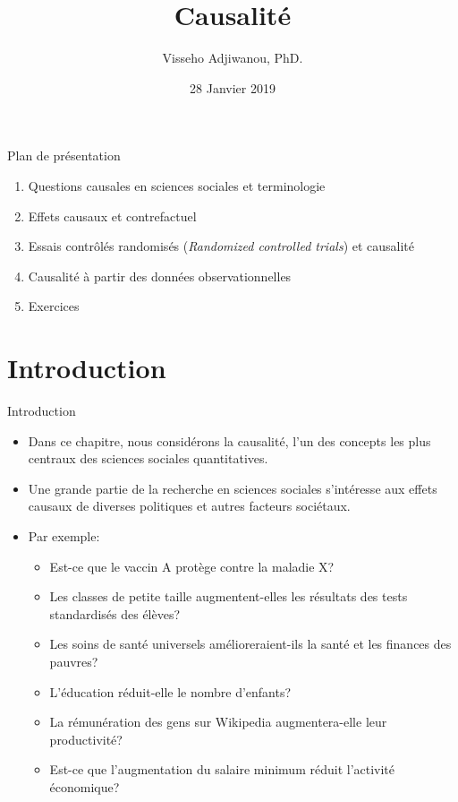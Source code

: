 \documentclass[ignorenonframetext,]{beamer}
\title{Causalité}
\author{Visseho Adjiwanou, PhD.}
\institute{Département de Sociologie - UQAM}
\date{28 Janvier 2019}
\providecommand{\tightlist}{%
  \setlength{\itemsep}{0pt}\setlength{\parskip}{0pt}}
\begin{document}
\frame{\titlepage}

\begin{frame}{Plan de présentation}
\protect\hypertarget{plan-de-presentation}{}

\begin{enumerate}
\item
  Questions causales en sciences sociales et terminologie
\item
  Effets causaux et contrefactuel
\item
  Essais contrôlés randomisés (\emph{Randomized controlled trials}) et
  causalité
\item
  Causalité à partir des données observationnelles
\item
  Exercices
\end{enumerate}

\end{frame}

\hypertarget{introduction}{%
\section{Introduction}\label{introduction}}

\begin{frame}{Introduction}
\protect\hypertarget{introduction-1}{}

\begin{itemize}
\tightlist
\item
  Dans ce chapitre, nous considérons la causalité, l'un des concepts les
  plus centraux des sciences sociales quantitatives.
\item
  Une grande partie de la recherche en sciences sociales s'intéresse aux
  effets causaux de diverses politiques et autres facteurs sociétaux.
\item
  Par exemple:

  \begin{itemize}
  \tightlist
  \item
    Est-ce que le vaccin A protège contre la maladie X?
  \item
    Les classes de petite taille augmentent-elles les résultats des
    tests standardisés des élèves?
  \item
    Les soins de santé universels amélioreraient-ils la santé et les
    finances des pauvres?
  \item
    L'éducation réduit-elle le nombre d'enfants?
  \item
    La rémunération des gens sur Wikipedia augmentera-elle leur
    productivité?
  \item
    Est-ce que l'augmentation du salaire minimum réduit l'activité
    économique?
  \end{itemize}
\end{itemize}

\end{frame}
\end{document}
